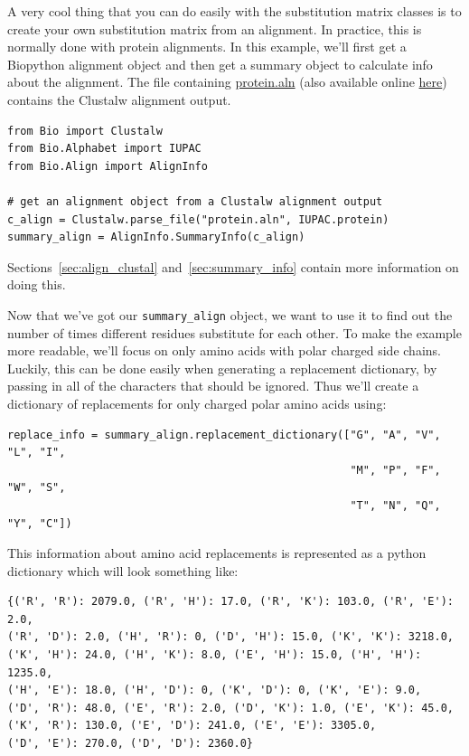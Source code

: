 \documentclass{report}
\begin{document}
A very cool thing that you can do easily with the substitution matrix
classes is to create your own substitution matrix from an
alignment. In practice, this is normally done with protein
alignments. In this example, we'll first get a Biopython alignment
object and then get a summary object to calculate info about the
alignment. The file containing \href{examples/protein.aln}{protein.aln}
(also available online
\href{http://biopython.org/DIST/docs/tutorial/examples/protein.aln}{here})
contains the Clustalw alignment output.

\begin{verbatim}
from Bio import Clustalw
from Bio.Alphabet import IUPAC
from Bio.Align import AlignInfo

# get an alignment object from a Clustalw alignment output
c_align = Clustalw.parse_file("protein.aln", IUPAC.protein)
summary_align = AlignInfo.SummaryInfo(c_align)
\end{verbatim}

Sections~\ref{sec:align_clustal} and~\ref{sec:summary_info} contain
more information on doing this.

Now that we've got our \verb|summary_align| object, we want to use it
to find out the number of times different residues substitute for each
other. To make the example more readable, we'll focus on only amino
acids with polar charged side chains. Luckily, this can be done easily
when generating a replacement dictionary, by passing in all of the
characters that should be ignored. Thus we'll create a dictionary of
replacements for only charged polar amino acids using:

\begin{verbatim}
replace_info = summary_align.replacement_dictionary(["G", "A", "V", "L", "I",
                                                     "M", "P", "F", "W", "S",
                                                     "T", "N", "Q", "Y", "C"])
\end{verbatim}

This information about amino acid replacements is represented as a
python dictionary which will look something like:

\begin{verbatim}
{('R', 'R'): 2079.0, ('R', 'H'): 17.0, ('R', 'K'): 103.0, ('R', 'E'): 2.0,
('R', 'D'): 2.0, ('H', 'R'): 0, ('D', 'H'): 15.0, ('K', 'K'): 3218.0,
('K', 'H'): 24.0, ('H', 'K'): 8.0, ('E', 'H'): 15.0, ('H', 'H'): 1235.0,
('H', 'E'): 18.0, ('H', 'D'): 0, ('K', 'D'): 0, ('K', 'E'): 9.0,
('D', 'R'): 48.0, ('E', 'R'): 2.0, ('D', 'K'): 1.0, ('E', 'K'): 45.0,
('K', 'R'): 130.0, ('E', 'D'): 241.0, ('E', 'E'): 3305.0,
('D', 'E'): 270.0, ('D', 'D'): 2360.0}
\end{verbatim}
\end{document}
